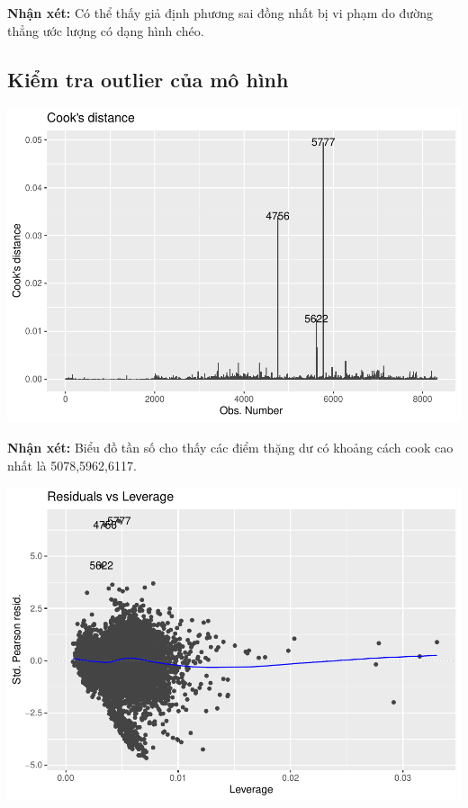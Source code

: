 \documentclass[
  11pt,
  letterpaper,
]{article}
\begin{document}
\textbf{Nhận xét:} Có thể thấy giả định phương sai đồng nhất bị vi phạm do đường thẳng ước lượng có dạng hình chéo.

\subsection{Kiểm tra outlier của mô hình}

\begin{center}\includegraphics[width=1.2\linewidth,]{Final_Project_files/figure-latex/unnamed-chunk-36-1} \end{center}

\textbf{Nhận xét:} Biểu đồ tần số cho thấy các điểm thặng dư có khoảng cách cook cao nhất là 5078,5962,6117.

\begin{center}\includegraphics[width=1.2\linewidth,]{Final_Project_files/figure-latex/unnamed-chunk-37-1} \end{center}
\end{document}
